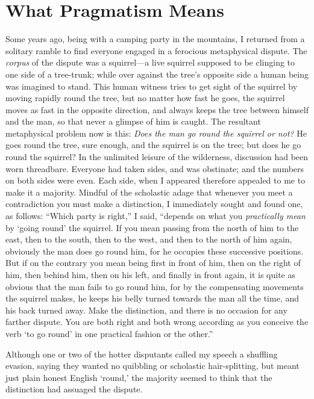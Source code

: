 
\author{William James}
\chapter{What Pragmatism Means}

Some years ago, being with a camping party in the mountains,
I returned from a solitary ramble to find everyone engaged in a
ferocious metaphysical dispute. The \textit{corpus} of the dispute was
a squir\-rel---a live squirrel supposed to be clinging to one side of
a tree-trunk; while over against the tree's opposite side a human
being was imagined to stand. This human witness tries to get sight of
the squirrel by moving rapidly round the tree, but no matter how fast
he goes, the squirrel moves as fast in the opposite direction, and
always keeps the tree between himself and the man, so that never a
glimpse of him is caught. The resultant metaphysical problem now is
this: \textit{Does the man go round the squirrel or not?} He goes
round the tree, sure enough, and the squirrel is on the tree; but does
he go round the squirrel? In the unlimited leisure of the wilderness,
discussion had been worn threadbare. Everyone had taken sides, and was
obstinate; and the numbers on  both sides were even. Each
side, when I appeared therefore appealed to me to make it a majority.
Mindful of the scholastic adage that whenever you meet a contradiction
you must make a distinction, I immediately sought and found one, as
follows: ``Which party is right,'' I said, ``depends on what you
\textit{practically mean} by `going round' the squirrel. If you mean
passing from the north of him to the east, then to the south, then to
the west, and then to the north of him again, obviously the man does
go round him, for he occupies these successive positions. But if on
the contrary you mean being first in front of him, then on the right
of him, then behind him, then on his left, and finally in front again,
it is quite as obvious that the man fails to go round him, for by the
compensating movements the squirrel makes, he keeps his belly turned
towards the man all the time, and his back turned away. Make the
distinction, and there is no occasion for any farther dispute. You are
both right and both wrong according as you conceive the verb `to go
round' in one practical fashion or the other.''

Although one or two of the hotter disputants called my speech
a shuffling evasion, saying they wanted no quibbling or scholastic
hair-splitting, but meant just plain honest English `round,' the
majority seemed to think that the distinction had assuaged the
dispute.

